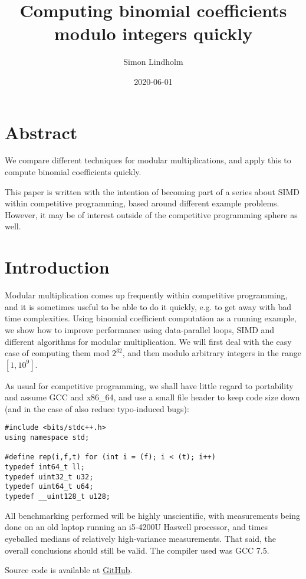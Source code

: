 \documentclass{article}
\title{Computing binomial coefficients modulo integers quickly}
\author{Simon Lindholm}
\date{2020-06-01}
\begin{document}
\maketitle

\section*{Abstract}
We compare different techniques for modular multiplications, and apply this to compute binomial coefficients quickly.

This paper is written with the intention of becoming part of a series about SIMD within competitive programming, based around different example problems.
However, it may be of interest outside of the competitive programming sphere as well.

\tableofcontents

\section{Introduction}

Modular multiplication comes up frequently within competitive programming,
and it is sometimes useful to be able to do it quickly, e.g. to get away
with bad time complexities.
Using binomial coefficient computation as a running example, we show how
to improve performance using data-parallel loops, SIMD and different
algorithms for modular multiplication.
We will first deal with the easy case of computing them mod $2^{32}$, and
then modulo arbitrary integers in the range $[1, 10^9]$.

As usual for competitive programming, we shall have
little regard to portability and assume GCC and x86\_64,
and use a small file header to keep code size down (and
in the case of \verb@rep@ also reduce typo-induced bugs):

\begin{lstlisting}
#include <bits/stdc++.h>
using namespace std;

#define rep(i,f,t) for (int i = (f); i < (t); i++)
typedef int64_t ll;
typedef uint32_t u32;
typedef uint64_t u64;
typedef __uint128_t u128;
\end{lstlisting}

All benchmarking performed will be highly unscientific,
with measurements being done on an old laptop running an i5-4200U Haswell processor,
and times eyeballed medians of relatively high-variance measurements.
That said, the overall conclusions should still be valid.
The compiler used was GCC 7.5.

Source code is available at \href{https://github.com/simonlindholm/simd-book/tree/master/binomial-coefficients}{GitHub}.




\end{document}
